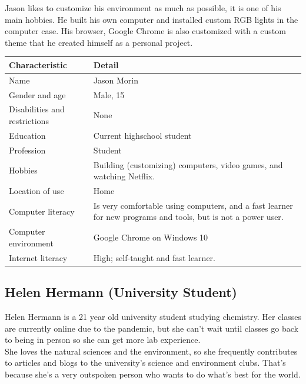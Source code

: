\documentclass[11pt,onside]{report}
\begin{document}
Jason likes to customize his environment as much as possible, it is one of his main hobbies. He built his own computer and installed custom RGB lights in the computer case. His browser, Google Chrome is also customized with a custom theme that he created himself as a personal project.
\begin{center}
    \begin{tabular}{|p{4cm}|p{10cm}|}
        \hline
        \bf{Characteristic} & \bf{Detail} \\
        \hline
        Name & Jason Morin \\
        \hline
        Gender and age & Male, 15 \\
        \hline
        Disabilities and restrictions & None \\
        \hline
        Education & Current highschool student \\
        \hline
        Profession & Student \\
        \hline
        Hobbies & Building (customizing) computers, video games, and watching Netflix. \\
        \hline
        Location of use & Home \\
        \hline
        Computer literacy & Is very comfortable using computers, and a fast learner for new programs and tools, but is not a power user. \\
        \hline
        Computer environment & Google Chrome on Windows 10 \\
        \hline
        Internet literacy &  High; self-taught and fast learner. \\
        \hline
    \end{tabular}
\end{center}

\subsection{Helen Hermann (University Student)}
Helen Hermann is a 21 year old university student studying chemistry. Her classes are currently online due to the pandemic, but she can’t wait until classes go back to being in person so she can get more lab experience. \\

She loves the natural sciences and the environment, so she frequently contributes to articles and blogs to the university’s science and environment clubs. That’s because she’s a very outspoken person who wants to do what’s best for the world.  \\
\end{document}
